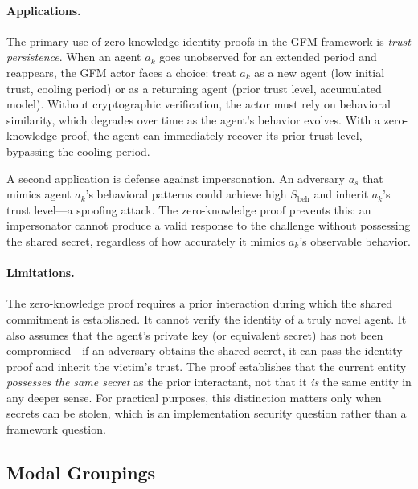 \paragraph{Applications.} The primary use of zero-knowledge identity proofs in the GFM framework is \emph{trust persistence}. When an agent $a_k$ goes unobserved for an extended period and reappears, the GFM actor faces a choice: treat $a_k$ as a new agent (low initial trust, cooling period) or as a returning agent (prior trust level, accumulated model). Without cryptographic verification, the actor must rely on behavioral similarity, which degrades over time as the agent's behavior evolves. With a zero-knowledge proof, the agent can immediately recover its prior trust level, bypassing the cooling period.

A second application is defense against impersonation. An adversary $a_s$ that mimics agent $a_k$'s behavioral patterns could achieve high $S_{\mathrm{beh}}$ and inherit $a_k$'s trust level---a spoofing attack. The zero-knowledge proof prevents this: an impersonator cannot produce a valid response to the challenge without possessing the shared secret, regardless of how accurately it mimics $a_k$'s observable behavior.

\paragraph{Limitations.} The zero-knowledge proof requires a prior interaction during which the shared commitment is established. It cannot verify the identity of a truly novel agent. It also assumes that the agent's private key (or equivalent secret) has not been compromised---if an adversary obtains the shared secret, it can pass the identity proof and inherit the victim's trust. The proof establishes that the current entity \emph{possesses the same secret} as the prior interactant, not that it \emph{is} the same entity in any deeper sense. For practical purposes, this distinction matters only when secrets can be stolen, which is an implementation security question rather than a framework question.


\subsection{Modal Groupings}
\label{app:modal_groupings}

